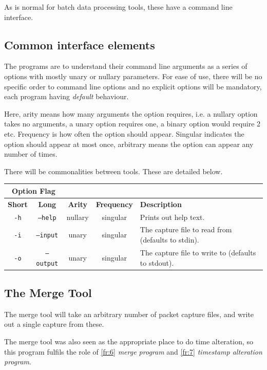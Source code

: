 \documentclass[10pt,a4paper,notitlepage,twoside]{report}
\begin{document}
As is normal for batch data processing tools, these have a command line interface.

\subsection{Common interface elements}
The programs are to understand their command line arguments as a series of options with mostly unary or nullary parameters. For ease of use, there will be no specific order to command line options and no explicit options will be mandatory, each program having \emph{default} behaviour.

Here, arity means how many arguments the option requires, i.e. a nullary option takes no arguments,  a unary option requires one, a binary option would require 2 etc.
Frequency is how often the option should appear. Singular indicates the option should appear at most once, arbitrary means the option can appear any number of times.

There will be commonalities between tools. These are detailed below.

\begin{tabularx}{\textwidth}{|c|c|c|c|X|}
\cline{1-2}
\multicolumn{2}{|c|}{\textbf{Option Flag}} & \multicolumn{3}{c}{}\\ \hline
\textbf{Short} & \textbf{Long} & \textbf{Arity} & \textbf{Frequency} & \textbf{Description} \\ \hline
\texttt{-h} & \texttt{--help} & nullary & singular & Prints out help text.\\\hline
\texttt{-i} & \texttt{--input} & unary & singular & The capture file to read from (defaults to stdin).\\ \hline
\texttt{-o} & \texttt{--output} & unary & singular & The capture file to write to (defaults to stdout).\\ \hline
\end{tabularx}

\subsection{The Merge Tool}
The merge tool will take an arbitrary number of packet capture files, and write out a single capture from these.

The merge tool was also seen as the appropriate place to do time alteration, so this program fulfils the role of \ref{fr:6} \emph{merge program} and \ref{fr:7} \emph{timestamp alteration program}.
\end{document}
